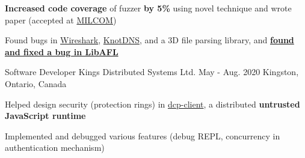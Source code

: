 \begin{cventries}
{\begin{cvitems}
        \item{\textbf{Increased code coverage} of fuzzer \textbf{by 5\%} using novel technique and wrote paper (accepted at \href{https://milcom2023.milcom.org}{MILCOM})} %
        \item{Found bugs in \href{https://www.wireshark.org}{Wireshark}, \href{https://github.com/CZ-NIC/knot}{KnotDNS}, and a 3D file parsing library, and \textbf{\href{https://github.com/AFLplusplus/LibAFL/pull/1317}{found and fixed a bug in LibAFL}}}
      \end{cvitems}
    }

  \cventry
    {Software Developer} %
    {Kings Distributed Systems Ltd.} %
    {May - Aug. 2020} %
    {Kingston, Ontario, Canada} %
    {
      \begin{cvitems} %
        \item{Helped design security (protection rings) in \href{https://www.npmjs.com/package/dcp-client}{dcp-client}, a distributed \textbf{untrusted JavaScript runtime}}
        \item{Implemented and debugged various features (debug REPL, concurrency in authentication mechanism)} %
      \end{cvitems}
    }


\end{cventries}
